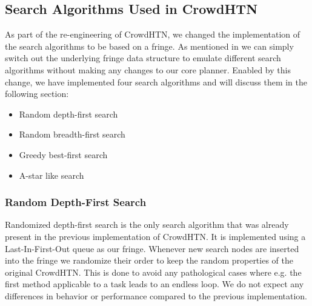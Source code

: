 \subsection{Search Algorithms Used in CrowdHTN}
As part of the re-engineering of CrowdHTN, we changed the implementation of the search algorithms to be based on a fringe. As mentioned in \cite{holler2020htn} we can simply switch out the underlying fringe data structure to emulate different search algorithms without making any changes to our core planner. Enabled by this change, we have implemented four search algorithms and will discuss them in the following section:
\begin{itemize}
	\item Random depth-first search
	\item Random breadth-first search
	\item Greedy best-first search
	\item A-star like search 
\end{itemize}

\subsubsection{Random Depth-First Search}
Randomized depth-first search is the only search algorithm that was already present in the previous implementation of CrowdHTN. It is implemented using a Last-In-First-Out queue as our fringe. Whenever new search nodes are inserted into the fringe we randomize their order to keep the random properties of the original CrowdHTN. This is done to avoid any pathological cases where e.g. the first method applicable to a task leads to an endless loop. We do not expect any differences in behavior or performance compared to the previous implementation.

